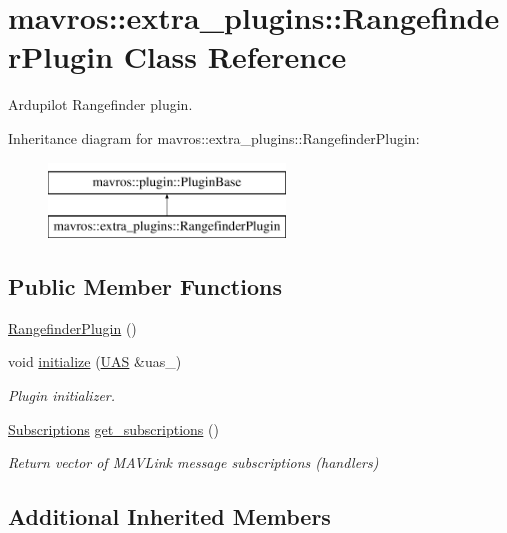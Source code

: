 \hypertarget{classmavros_1_1extra__plugins_1_1RangefinderPlugin}{}\section{mavros\+::extra\+\_\+plugins\+::Rangefinder\+Plugin Class Reference}
\label{classmavros_1_1extra__plugins_1_1RangefinderPlugin}


Ardupilot Rangefinder plugin.  


Inheritance diagram for mavros\+::extra\+\_\+plugins\+::Rangefinder\+Plugin\+:\begin{figure}[H]
\begin{center}
\leavevmode
\includegraphics[height=2.000000cm]{classmavros_1_1extra__plugins_1_1RangefinderPlugin}
\end{center}
\end{figure}
\subsection*{Public Member Functions}
\begin{DoxyCompactItemize}
\item 
\mbox{\hyperlink{group__plugin_gab0a112620c3efe3757c993f0b2bfb9fa}{Rangefinder\+Plugin}} ()
\item 
void \mbox{\hyperlink{group__plugin_gad13e24eaf9016887b2544eb816ab3327}{initialize}} (\mbox{\hyperlink{classmavros_1_1UAS}{U\+AS}} \&uas\+\_\+)
\begin{DoxyCompactList}\small\item\em Plugin initializer. \end{DoxyCompactList}\item 
\mbox{\hyperlink{group__plugin_ga8967d61fc77040e0c3ea5a4585d62a09}{Subscriptions}} \mbox{\hyperlink{group__plugin_ga8911e15033c33875a44b518584464b81}{get\+\_\+subscriptions}} ()
\begin{DoxyCompactList}\small\item\em Return vector of M\+A\+V\+Link message subscriptions (handlers) \end{DoxyCompactList}\end{DoxyCompactItemize}
\subsection*{Additional Inherited Members}


